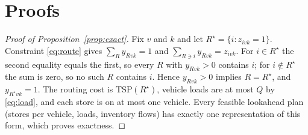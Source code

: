 \appendix
\section{Proofs}\label{app:proofs}

\begin{proof}[Proof of Proposition~\ref{prop:exact}]
Fix $v$ and $k$ and let $R^\star=\{i:z_{ivk}=1\}$. Constraint \eqref{eq:route} gives $\sum_R y_{Rvk}=1$ and $\sum_{R\ni i}y_{Rvk}=z_{ivk}$. For $i\in R^\star$ the second equality equals the first, so every $R$ with $y_{Rvk}>0$ contains $i$; for $i\notin R^\star$ the sum is zero, so no such $R$ contains $i$. Hence $y_{Rvk}>0$ implies $R=R^\star$, and $y_{R^\star vk}=1$. The routing cost is $\mathrm{TSP}(R^\star)$, vehicle loads are at most $Q$ by \eqref{eq:load}, and each store is on at most one vehicle. Every feasible lookahead plan (stores per vehicle, loads, inventory flows) has exactly one representation of this form, which proves exactness.
\end{proof}

